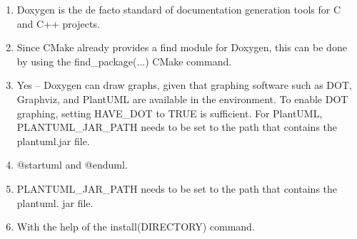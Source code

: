 

\begin{enumerate}
\item 
Doxygen is the de facto standard of documentation generation tools for C and C++ projects.

\item
Since CMake already provides a find module for Doxygen, this can be done by using the find\_package(...) CMake command.

\item 
Yes – Doxygen can draw graphs, given that graphing software such as DOT, Graphviz, and PlantUML are available in the environment. To enable DOT graphing, setting HAVE\_DOT to TRUE is sufficient. For PlantUML, PLANTUML\_JAR\_PATH needs to be set to the path that contains the plantuml.jar file.

\item 
@startuml and @enduml.

\item 
PLANTUML\_JAR\_PATH needs to be set to the path that contains the plantuml. jar file.

\item 
With the help of the install(DIRECTORY) command.
\end{enumerate}